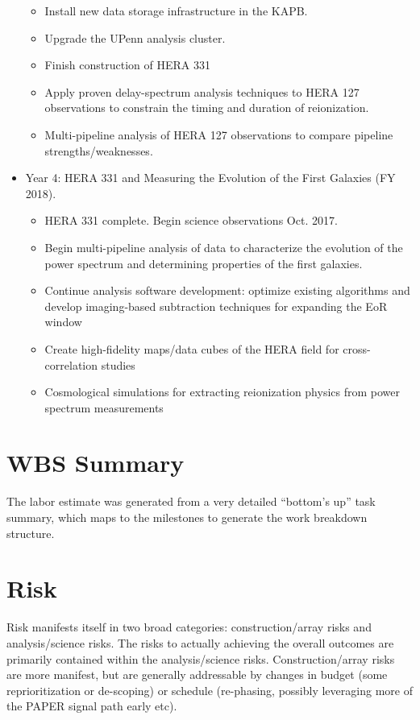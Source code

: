 \documentclass[preprint]{aastex}
\begin{document}
\begin{itemize}[itemsep=-4pt,parsep=-3pt]
\begin{itemize}[itemsep=-4pt]
\item Install new data storage infrastructure in the KAPB. 
\item Upgrade the UPenn analysis cluster. 
\item Finish construction of HERA 331
\item Apply proven delay-spectrum analysis techniques to HERA 127 observations to constrain the timing and duration of reionization. 
\item Multi-pipeline analysis of HERA 127 observations to compare pipeline strengths/weaknesses.
\end{itemize}
\item Year 4:  HERA 331 and Measuring the Evolution of the First Galaxies (FY 2018). 
\begin{itemize}[itemsep=-4pt]
\item HERA 331 complete. Begin science observations Oct. 2017. 
\item Begin multi-pipeline analysis of data to characterize the evolution of the power spectrum and determining properties of the first galaxies. 
\item Continue analysis software development: optimize existing algorithms and develop imaging-based subtraction techniques for expanding the EoR window
\item Create high-fidelity maps/data cubes of the HERA field for cross-correlation studies
\item Cosmological simulations for extracting reionization physics from power spectrum measurements
\end{itemize}
\end{itemize}

\section{WBS Summary}
\label{sec:wbs}
The labor estimate was generated from a very detailed ``bottom's up'' task summary, which maps to the milestones to generate the work breakdown structure.

\section{Risk}
\label{sec:risk}
Risk manifests itself in two broad categories: construction/array risks and
analysis/science risks. The risks to actually achieving the overall outcomes are
primarily contained within the analysis/science risks. Construction/array risks are
more manifest, but are generally addressable by changes in budget (some
reprioritization or de-scoping) or schedule (re-phasing, possibly leveraging more of
the PAPER signal path early etc).
\end{document}
